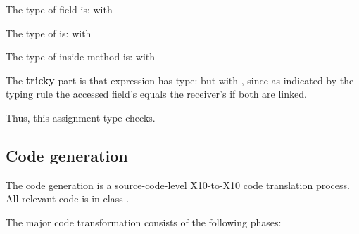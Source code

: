 \documentclass{article}
\begin{document}
\begin{enumerate}
\CodeIn{\}}

The type of  field is:  with 

The type of  is:  with 

The type of  inside method 
is:  with 

The \textbf{tricky} part is that expression  has type:  but with , since as indicated by the typing rule the accessed field's  equals the receiver's  if both are linked.

Thus, this assignment  type checks.


\end{enumerate}



\subsection{Code generation}
\label{sec:codegen}

The code generation is a source-code-level X10-to-X10 code translation process. All relevant code is in class .

The major code transformation consists of the following phases:
\end{document}
